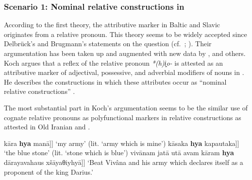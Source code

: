 \subsubsection{Scenario 1: Nominal relative constructions in }
According to the first theory, the attributive marker in Baltic and Slavic originates from a relative pronoun. This theory seems to be widely accepted since Delbrück's and Brugmann's statements on the question (cf.~\citealt[432–433]{delbruck1893}; \citealt[331, 344]{brugmann-etal1916}). Their argumentation has been taken up and augmented with new data by \citet{schmidt1959}, \citet{koch1992,koch1999} and others. Koch argues that a reflex of the  relative pronoun \textit{*(h)i̭o-} is attested as an attributive marker of adjectival, possessive, and adverbial modifiers of nouns in . He describes the constructions in which these attributes occur as “nominal relative constructions” \citep[470, passim]{koch1999}.

The most substantial part in Koch's argumentation seems to be the similar use of cognate relative pronouns as polyfunctional markers in relative constructions as attested in Old Iranian and .
\begin{exe}
\label{ez oldpersian}
\begin{xlist}
\ex	{\ob}kāra {\ob}\textbf{hya} manā{\upshape ]]}
\glt	‘my army’ (lit. ‘army which is mine’)
\ex	{\ob}kāsaka {\ob}\textbf{hya} kapautaka{\upshape ]]}
\glt	‘the blue stone’ (lit. ‘stone which is blue’)
\ex	vivānam jatā utā avam {\ob}kāram {\ob}\textbf{hya} dārayavahaus xšāyaθiyhyā{\upshape ]]}
\glt	‘Beat Vivâna and his army which declares itself as a proponent of the king Darius.’
\end{xlist}
\end{exe}

